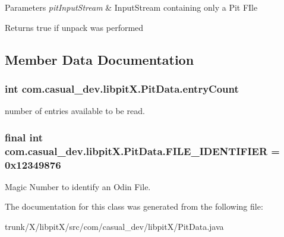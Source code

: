 \begin{DoxyParams}{Parameters}
{\em pit\-Input\-Stream} & Input\-Stream containing only a Pit F\-Ile \\
\hline
\end{DoxyParams}
\begin{DoxyReturn}{Returns}
true if unpack was performed 
\end{DoxyReturn}


\subsection{Member Data Documentation}
\hypertarget{classcom_1_1casual__dev_1_1libpit_x_1_1_pit_data_a675514f1324f841f0385dc972dad5d87}{
\subsubsection[{entry\-Count}]{\setlength{\rightskip}{0pt plus 5cm}int com.\-casual\-\_\-dev.\-libpit\-X.\-Pit\-Data.\-entry\-Count}}\label{classcom_1_1casual__dev_1_1libpit_x_1_1_pit_data_a675514f1324f841f0385dc972dad5d87}
number of entries available to be read. \hypertarget{classcom_1_1casual__dev_1_1libpit_x_1_1_pit_data_aac62ade2b33051f8fcbf59e2b7117fb5}{
\subsubsection[{F\-I\-L\-E\-\_\-\-I\-D\-E\-N\-T\-I\-F\-I\-E\-R}]{\setlength{\rightskip}{0pt plus 5cm}final int com.\-casual\-\_\-dev.\-libpit\-X.\-Pit\-Data.\-F\-I\-L\-E\-\_\-\-I\-D\-E\-N\-T\-I\-F\-I\-E\-R = 0x12349876\hspace{0.3cm}{\ttfamily [static]}}}\label{classcom_1_1casual__dev_1_1libpit_x_1_1_pit_data_aac62ade2b33051f8fcbf59e2b7117fb5}
Magic Number to identify an Odin File. 

The documentation for this class was generated from the following file\-:\begin{DoxyCompactItemize}
\item 
trunk/\-X/libpit\-X/src/com/casual\-\_\-dev/libpit\-X/Pit\-Data.\-java\end{DoxyCompactItemize}

